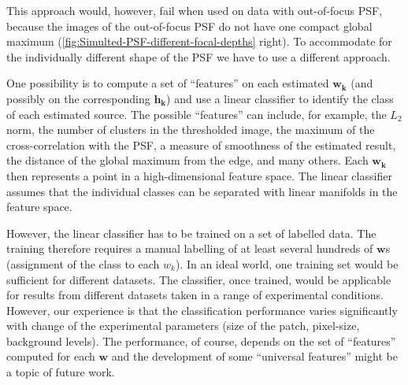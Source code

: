 This approach would, however, fail when used on data with out-of-focus PSF, because the images of the out-of-focus PSF do not have one compact global maximum (\autoref{fig:Simulted-PSF-different-focal-depths} right). To accommodate for the individually different shape of the PSF we have to use a different approach. 

One possibility is to compute a set of ``features'' on each estimated $\bm{w_k}$ (and possibly on the corresponding $\bm{h_k}$) and use a linear classifier to identify the class of each estimated source. The possible ``features'' can include, for example, the $L_2$ norm, the number of clusters in the thresholded image, the maximum of the cross-correlation with the PSF, a measure of smoothness of the estimated result, the distance of the global maximum from the edge, and many others. Each $\bm{w_k}$ then represents a point in a high-dimensional feature space. The linear classifier assumes that the individual classes can be separated with linear manifolds in the feature space.

However, the linear classifier has to be trained on a set of labelled data. The training therefore requires a manual labelling of at least several hundreds of $\bm{w}$s (assignment of the class to each $w_k$). In an ideal world, one training set would be sufficient for different datasets. The classifier, once trained, would be applicable for results from different datasets taken in a range of experimental conditions. However, our experience is that the classification performance varies significantly with change of the experimental parameters (size of the patch, pixel-size, background levels). The performance, of course, depends on the set of ``features'' computed for each $\bm{w}$ and the development of some ``universal features'' might be a topic of future work. 

